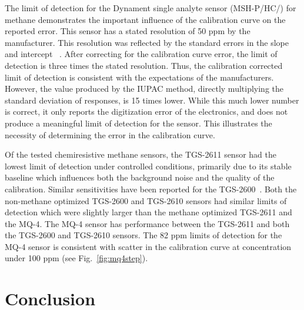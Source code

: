 \documentclass[times]{joehreview}
\begin{document}
	The limit of detection for the Dynament single analyte sensor (MSH-P/HC/) for methane demonstrates the important influence of the calibration curve on the reported error.  This sensor has a stated resolution of 50 ppm by the manufacturer.  This resolution was reflected by the standard errors in the slope and intercept ~\cite{long_limit_1983}.   After correcting for the calibration curve error, the limit of detection is three times the stated resolution.  Thus, the calibration corrected limit of detection is consistent with the expectations of the manufacturers.  However, the value produced by the IUPAC method, directly multiplying the standard deviation of responses, is 15 times lower.  While this much lower number is correct, it only reports the digitization error of the electronics, and does not produce a meaningful limit of detection for the sensor.  This illustrates the necessity of determining the error in the calibration curve.
	
	Of the tested chemiresistive methane sensors, the TGS-2611 sensor had the lowest limit of detection under controlled conditions, primarily due to its stable baseline which influences both the background noise and the quality of the calibration.  Similar sensitivities have been reported for the TGS-2600~\cite{eugster_performance_2012}.  Both the non-methane optimized TGS-2600 and TGS-2610 sensors had similar limits of detection which were slightly larger than the methane optimized TGS-2611 and the MQ-4.  The MQ-4 sensor has performance between the TGS-2611 and both the TGS-2600 and TGS-2610 sensors.  The 82 ppm limits of detection for the MQ-4 sensor is consistent with scatter in the calibration curve at concentration under 100 ppm (see Fig.~\ref{fig:mq4step}).
	
	\FloatBarrier	
	
	\section{Conclusion}
	
\end{document}
